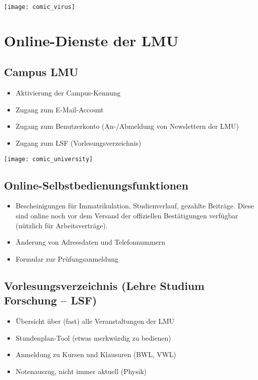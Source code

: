 \begin{center}
	{\texttt{[image: comic\_virus]}}
\end{center}

\section{Online-Dienste der LMU}
\subsection*{Campus LMU}
\begin{itemize}
	\item Aktivierung der Campus-Kennung
	\item Zugang zum E-Mail-Account
	\item Zugang zum Benutzerkonto (An-/Abmeldung von Newslettern der LMU)
	\item Zugang zum LSF (Vorlesungsverzeichnis)
\end{itemize}
\begin{urlList}
\end{urlList}

\begin{center}
	{\texttt{[image: comic\_university]}}
\end{center}

\subsection*{Online-Selbstbedienungsfunktionen}
\begin{itemize}
	\item Bescheinigungen für Immatrikulation, Studienverlauf, gezahlte Beiträge. Diese sind online noch vor dem Versand der offiziellen Bestätigungen verfügbar (nützlich für Arbeitsverträge).
	\item Änderung von Adressdaten und Telefonnummern
	\item Formular zur Prüfungsanmeldung
\end{itemize}
\begin{urlList}
\end{urlList}

\subsection*{Vorlesungsverzeichnis (Lehre Studium Forschung -- LSF)}
\begin{itemize}
	\item Übersicht über (fast) alle Veranstaltungen der LMU
	\item Stundenplan-Tool (etwas merkwürdig zu bedienen)
	\item Anmeldung zu Kursen und Klausuren (BWL, VWL)
	\item Notenauszug, nicht immer aktuell (Physik)
\end{itemize}
\begin{urlList}
\end{urlList}


